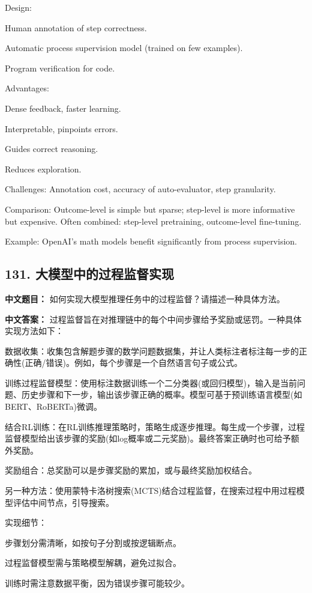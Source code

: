 \documentclass[10pt,a4paper]{ctexart}
\begin{document}
Design:

Human annotation of step correctness.

Automatic process supervision model (trained on few examples).

Program verification for code.

Advantages:

Dense feedback, faster learning.

Interpretable, pinpoints errors.

Guides correct reasoning.

Reduces exploration.

Challenges: Annotation cost, accuracy of auto-evaluator, step granularity.

Comparison: Outcome-level is simple but sparse; step-level is more informative but expensive. Often combined: step-level pretraining, outcome-level fine-tuning.

Example: OpenAI's math models benefit significantly from process supervision.

\subsection*{131. 大模型中的过程监督实现}
\textbf{中文题目：} 如何实现大模型推理任务中的过程监督？请描述一种具体方法。

\textbf{中文答案：}
过程监督旨在对推理链中的每个中间步骤给予奖励或惩罚。一种具体实现方法如下：

数据收集：收集包含解题步骤的数学问题数据集，并让人类标注者标注每一步的正确性(正确/错误)。例如，每个步骤是一个自然语言句子或公式。

训练过程监督模型：使用标注数据训练一个二分类器(或回归模型)，输入是当前问题、历史步骤和下一步，输出该步骤正确的概率。模型可基于预训练语言模型(如BERT、RoBERTa)微调。

结合RL训练：在RL训练推理策略时，策略生成逐步推理。每生成一个步骤，过程监督模型给出该步骤的奖励(如log概率或二元奖励)。最终答案正确时也可给予额外奖励。

奖励组合：总奖励可以是步骤奖励的累加，或与最终奖励加权结合。

另一种方法：使用蒙特卡洛树搜索(MCTS)结合过程监督，在搜索过程中用过程模型评估中间节点，引导搜索。

实现细节：

步骤划分需清晰，如按句子分割或按逻辑断点。

过程监督模型需与策略模型解耦，避免过拟合。

训练时需注意数据平衡，因为错误步骤可能较少。
\end{document}
